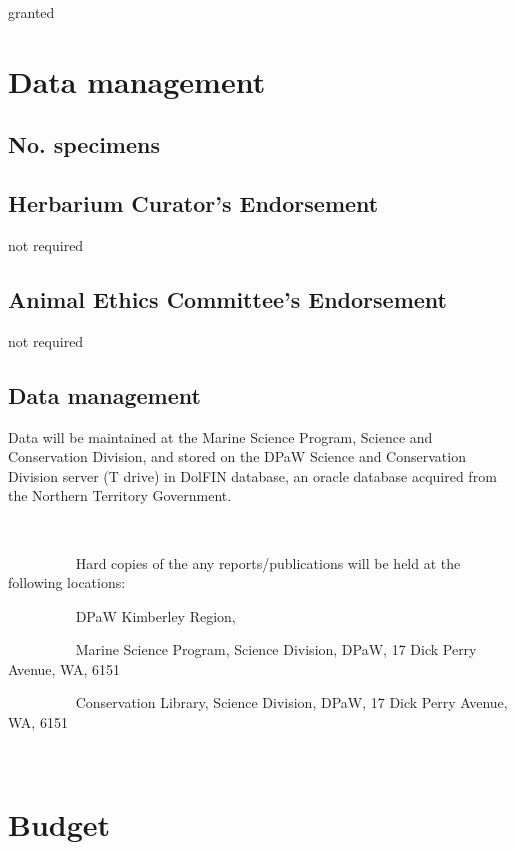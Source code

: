\documentclass[version=last,
    paper=a4,                               %
    10pt,                                   %
    dvipsnames,
    oneside,                              %
    headings=openany,                       %
    open=any,
    BCOR=7mm,                               %
    DIV=15,     %
]{scrbook}
\begin{document}
granted



\section*{Data management}


\subsection*{No. specimens}






\subsection*{Herbarium Curator's Endorsement}

not required




\subsection*{Animal Ethics Committee's Endorsement}

not required




\subsection*{Data management}

Data will be maintained at the Marine Science Program, Science and
Conservation Division, and stored on the DPaW Science and Conservation
Division server (T drive) in DolFIN database, an oracle database
acquired from the Northern Territory Government.

~

~~~~~~~~~ Hard copies of the any reports/publications will be held at
the following locations:

~~~~~~~~~ DPaW Kimberley Region,

~~~~~~~~~ Marine Science Program, Science Division, DPaW, 17 Dick Perry
Avenue, WA, 6151

~~~~~~~~~ Conservation Library, Science Division, DPaW, 17 Dick Perry
Avenue, WA, 6151

~




\section*{Budget}
\end{document}
